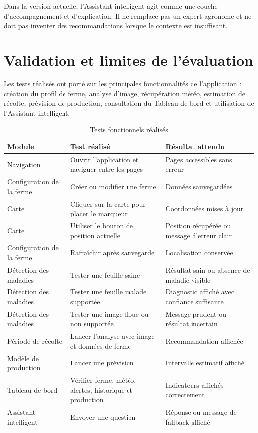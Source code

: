 \documentclass[12pt,a4paper]{report}
\begin{document}
Dans la version actuelle, l'Assistant intelligent agit comme une couche d'accompagnement et d'explication. Il ne remplace pas un expert agronome et ne doit pas inventer des recommandations lorsque le contexte est insuffisant.

\section{Validation et limites de l'évaluation}

Les tests réalisés ont porté sur les principales fonctionnalités de l'application : création du profil de ferme, analyse d'image, récupération météo, estimation de récolte, prévision de production, consultation du Tableau de bord et utilisation de l'Assistant intelligent.

\begin{table}[H]
\centering
\caption{Tests fonctionnels réalisés}
\label{tab:tests-fonctionnels}
\begin{tabular}{|p{3.8cm}|p{5.6cm}|p{3.4cm}|}
\hline
\textbf{Module} & \textbf{Test réalisé} & \textbf{Résultat attendu} \\
\hline
Navigation & Ouvrir l'application et naviguer entre les pages & Pages accessibles sans erreur \\
\hline
Configuration de la ferme & Créer ou modifier une ferme & Données sauvegardées \\
\hline
Carte & Cliquer sur la carte pour placer le marqueur & Coordonnées mises à jour \\
\hline
Carte & Utiliser le bouton de position actuelle & Position récupérée ou message d'erreur clair \\
\hline
Configuration de la ferme & Rafraîchir après sauvegarde & Localisation conservée \\
\hline
Détection des maladies & Tester une feuille saine & Résultat sain ou absence de maladie visible \\
\hline
Détection des maladies & Tester une feuille malade supportée & Diagnostic affiché avec confiance suffisante \\
\hline
Détection des maladies & Tester une image floue ou non supportée & Message prudent ou résultat incertain \\
\hline
Période de récolte & Lancer l'analyse avec image et données de ferme & Recommandation affichée \\
\hline
Modèle de production & Lancer une prévision & Intervalle estimatif affiché \\
\hline
Tableau de bord & Vérifier ferme, météo, alertes, historique et production & Indicateurs affichés correctement \\
\hline
Assistant intelligent & Envoyer une question & Réponse ou message de fallback affiché \\
\hline
\end{tabular}
\end{table}
\end{document}
